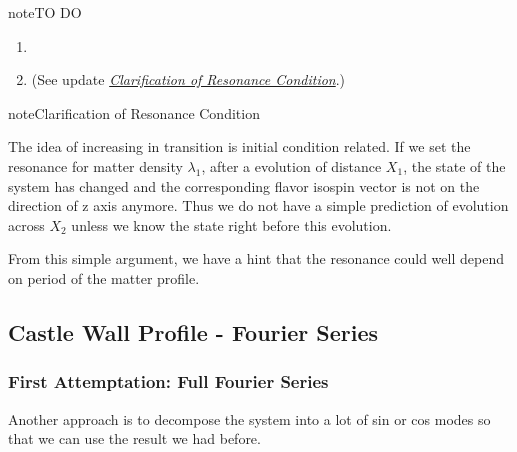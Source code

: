 \documentclass[letterpaper,12pt,english]{sphinxmanual}
\begin{document}
\begin{sphinxadmonition}{note}{TO DO}
\begin{enumerate}
\item {} 

\item {} 
 (See update {\hyperref[\detokenize{matter-stimulated/parametric-resonance-revisted:clarification-of-the-resonance-condition}]{\emph{Clarification of Resonance Condition}}}.)

\end{enumerate}
\end{sphinxadmonition}
\label{\detokenize{matter-stimulated/parametric-resonance-revisted:clarification-of-the-resonance-condition}}
\begin{sphinxadmonition}{note}{Clarification of Resonance Condition}

The idea of increasing in transition is initial condition related. If we set the resonance for matter density \(\lambda_1\), after a evolution of distance \(X_1\), the state of the system has changed and the corresponding flavor isospin vector is not on the direction of z axis anymore. Thus we do not have a simple prediction of evolution across \(X_2\) unless we know the state right before this evolution.

From this simple argument, we have a hint that the resonance could well depend on period of the matter profile.
\end{sphinxadmonition}


\subsection{Castle Wall Profile - Fourier Series}
\label{\detokenize{matter-stimulated/parametric-resonance-revisted:castle-wall-profile-fourier-series}}

\subsubsection{First Attemptation: Full Fourier Series}
\label{\detokenize{matter-stimulated/parametric-resonance-revisted:first-attemptation-full-fourier-series}}
Another approach is to decompose the system into a lot of sin or cos modes so that we can use the result we had before.
\end{document}
